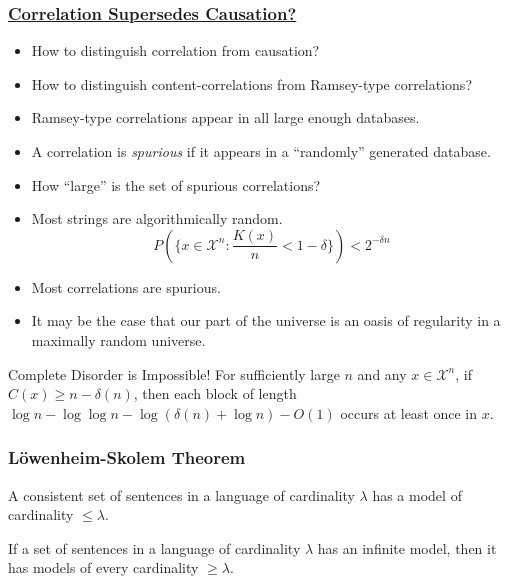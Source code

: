 \documentclass[UTF8,aspectratio=43,11pt,colorlinks,compress,openany]{beamer}%
\begin{document}
\begin{frame}\frametitle{\href{https://www.cs.auckland.ac.nz/~cristian/crispapers/fos2016.pdf}{Correlation Supersedes Causation?}}\vspace{-1ex}
	\begin{itemize}
		\item How to distinguish correlation from causation?
		\item How to distinguish content-correlations from Ramsey-type correlations?
		\item Ramsey-type correlations appear in all
		large enough databases.
		\item A correlation is \emph{spurious} if it appears in a ``randomly'' generated database.
		\item How ``large'' is the set of spurious correlations?
		\item Most strings are algorithmically random. 
		\[P\left(\Big\{x\in\mathcal{X}^n: \frac{K(x)}{n}<1-\delta\Big\}\right)<2^{-\delta n}\]
		\item Most correlations are spurious.
		\item It may be the case that our part of the universe is an oasis of regularity in a maximally random universe.
	\end{itemize}\vspace{-1ex}
	\begin{block}{Complete Disorder is Impossible!}
		For sufficiently large $n$ and any $x\in\mathcal{X}^n$, if $C(x)\geq n-\delta(n)$, then each block of length $\log n-\log\log n-\log(\delta(n)+\log n)-O(1)$ occurs at least once in $x$.
	\end{block}
\end{frame}

\begin{frame}\frametitle{L\"owenheim-Skolem Theorem}
	\begin{theorem}
		A consistent set of sentences in a language of cardinality $\lambda$ has a model of cardinality $\leq\lambda$.
	\end{theorem}
	\begin{theorem}
		If a set of sentences in a language of cardinality $\lambda$ has an infinite model, then it has models of every cardinality $\geq\lambda$.
	\end{theorem}
\end{frame}
\end{document}
